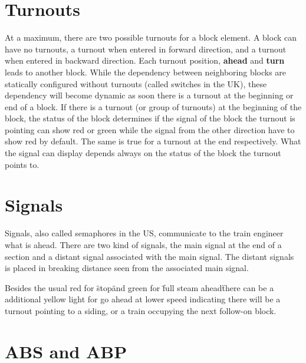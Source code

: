\section{Turnouts}

At a maximum, there are two possible turnouts for a block element. A block can have no turnouts, a turnout when entered in forward direction, and a turnout when entered in backward direction. Each turnout position, \textbf{ahead} and \textbf{turn} leads to another block. While the dependency between neighboring blocks are statically configured without turnouts (called switches in the UK), these dependency will become dynamic as soon there is a turnout at the beginning or end of a block. If there is a turnout (or group of turnouts) at the beginning of the block, the status of the block determines if the signal of the block the turnout is pointing can show red or green while the signal from the other direction have to show red by default. The same is true for a turnout at the end respectively. What the signal can display depends always on the status of the block the turnout points to.

\section{Signals}

Signals, also called semaphores in the US, communicate to the train engineer what is ahead. There are two kind of signals, the main signal at the end of a section and a distant signal associated with the main signal. The distant signals is placed in breaking distance seen from the associated main signal. 

Besides the usual red for \"stop\" and green for \"full steam ahead\" there can be a additional yellow light for go ahead at lower speed indicating there will be a turnout pointing to a siding, or a train occupying the next follow-on block.

\section{ABS and ABP}


